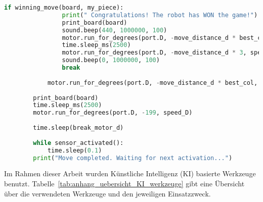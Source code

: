 \begin{lstlisting}[language=Python]
			if winning_move(board, my_piece):
				print(" Congratulations! The robot has WON the game!")
				print_board(board)
				sound.beep(440, 1000000, 100)
				motor.run_for_degrees(port.D, -move_distance_d * best_col, speed_D)
				time.sleep_ms(2500)
				motor.run_for_degrees(port.D, -move_distance_d * 3, speed_D)
				sound.beep(0, 1000000, 100)
				break
				
			motor.run_for_degrees(port.D, -move_distance_d * best_col, speed_D)
		
		print_board(board)
		time.sleep_ms(2500)
		motor.run_for_degrees(port.D, -199, speed_D)
		
		time.sleep(break_motor_d)
		
		while sensor_activated():
			time.sleep(0.1)
		print("Move completed. Waiting for next activation...")
\end{lstlisting}
\clearpage


\setcounter{chapter}{2}

Im Rahmen dieser Arbeit wurden Künstliche Intelligenz (KI) basierte Werkzeuge benutzt. Tabelle~\ref{tab:anhang_uebersicht_KI_werkzeuge} gibt eine Übersicht über die verwendeten Werkzeuge und den jeweiligen Einsatzzweck.

